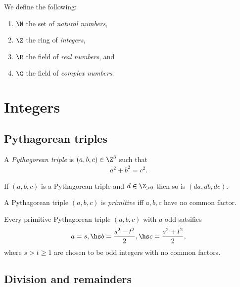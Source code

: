 \documentclass{article}
\begin{document}
\begin{definition}
	We define the following:
	\begin{enumerate}
		\item $\N$ the set of \emph{natural numbers},
		\item $\Z$ the ring of \emph{integers},
		\item $\R$ the field of \emph{real numbers}, and
		\item $\C$ the field of \emph{complex numbers}.
	\end{enumerate}
\end{definition}

\section{Integers}

\subsection{Pythagorean triples}

\begin{definition}
	A \emph{Pythagorean triple} is $(a,b,c)\in\Z^3$ such that
	\begin{align*}
		a^2 + b^2 = c^2.
	\end{align*}
\end{definition}

\begin{lemma}[Lecture 1]
	If $(a,b,c)$ is a Pythagorean triple and $d\in\Z_{>0}$ then
	so is $(da,db,dc)$.
\end{lemma}

\begin{definition}
	A Pythagorean triple $(a,b,c)$ is \emph{primitive} iff $a,b,c$ have no common factor.
\end{definition}

\begin{theorem}[Lecture 1]
	Every primitive Pythagorean triple $(a,b,c)$ with $a$ odd satsifies
	\begin{align*}
		a=s,\hs b=\frac{s^2-t^2}{2},\hs c=\frac{s^2+t^2}{2},
	\end{align*}
	where $s>t\geq 1$ are chosen to be odd integers with no common factors.
\end{theorem}

\subsection{Division and remainders}
\end{document}
